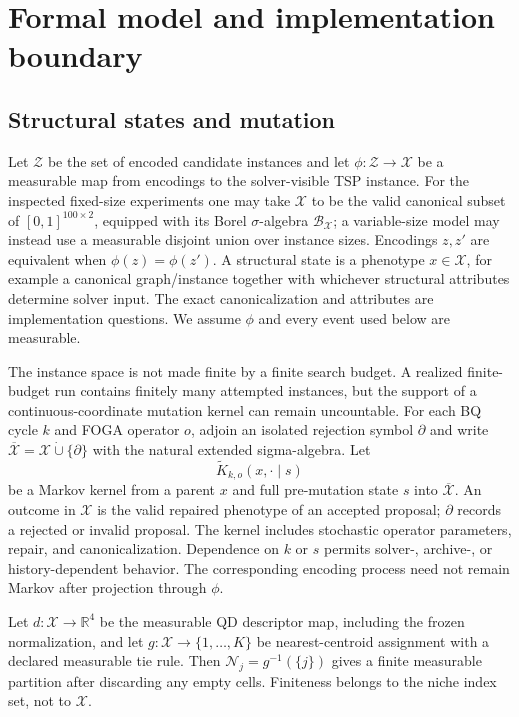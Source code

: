 \section{Formal model and implementation boundary}

\subsection{Structural states and mutation}
Let $\mathcal{Z}$ be the set of encoded candidate instances and let
$\phi:\mathcal{Z}\to\mathcal{X}$ be a measurable map from encodings to the
solver-visible TSP instance. For the inspected fixed-size experiments one may
take $\mathcal{X}$ to be the valid canonical subset of
$[0,1]^{100\times2}$, equipped with its Borel $\sigma$-algebra
$\mathcal{B}_{\mathcal X}$; a variable-size model may instead use a measurable disjoint
union over instance sizes. Encodings $z,z'$ are equivalent when
$\phi(z)=\phi(z')$. A structural state is a phenotype $x\in\mathcal{X}$,
for example a canonical graph/instance together with whichever structural
attributes determine solver input. The exact canonicalization and attributes
are implementation questions. We assume $\phi$ and every event used below are
measurable.

The instance space is not made finite by a finite search budget. A realized
finite-budget run contains finitely many attempted instances, but the support
of a continuous-coordinate mutation kernel can remain uncountable. For each
BQ cycle $k$ and FOGA operator $o$, adjoin an isolated rejection symbol
$\partial$ and write
$\overline{\mathcal X}=\mathcal X\mathbin{\dot\cup}\{\partial\}$ with the
natural extended sigma-algebra. Let
\[
 \widetilde K_{k,o}(x,\cdot\mid s)
\]
be a Markov kernel from a parent $x$ and full pre-mutation state $s$ into
$\overline{\mathcal X}$. An outcome in $\mathcal X$ is the valid repaired
phenotype of an accepted proposal; $\partial$ records a rejected or invalid
proposal. The kernel includes stochastic operator parameters, repair, and
canonicalization. Dependence on $k$ or $s$ permits solver-, archive-, or
history-dependent behavior. The corresponding encoding process need not
remain Markov after projection through $\phi$.

Let $d:\mathcal{X}\to\mathbb{R}^4$ be the measurable QD descriptor map,
including the frozen normalization, and let
$g:\mathcal{X}\to\{1,\ldots,K\}$ be nearest-centroid assignment with a
declared measurable tie rule. Then
$\mathcal{N}_j=g^{-1}(\{j\})$ gives a finite measurable partition after
discarding any empty cells. Finiteness belongs to the niche index set, not to
$\mathcal{X}$.

